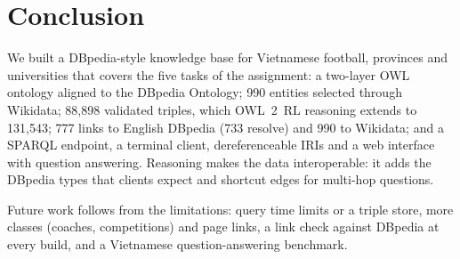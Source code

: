 \section{Conclusion}
\label{sec:conclusion}

We built a DBpedia-style knowledge base for Vietnamese football, provinces and
universities that covers the five tasks of the assignment: a two-layer OWL
ontology aligned to the DBpedia Ontology; 990 entities selected through
Wikidata; 88{,}898 validated triples, which OWL~2~RL reasoning extends to
131{,}543; 777 links to English DBpedia (733 resolve) and 990 to Wikidata; and
a SPARQL endpoint, a terminal client, dereferenceable IRIs and a web interface
with question answering. Reasoning makes the data interoperable: it adds the
DBpedia types that clients expect and shortcut edges for multi-hop questions.

Future work follows from the limitations: query time limits or a triple store,
more classes (coaches, competitions) and page links, a link check against
DBpedia at every build, and a Vietnamese question-answering benchmark.
